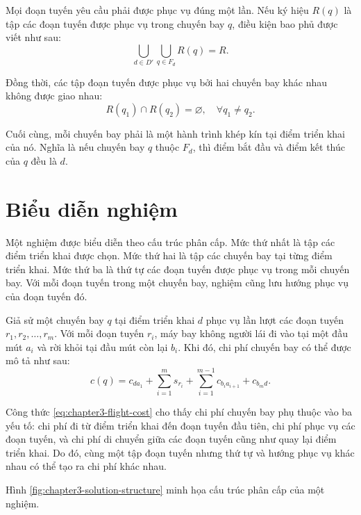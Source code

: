 Mọi đoạn tuyến yêu cầu phải được phục vụ đúng một lần. Nếu ký hiệu $R(q)$ là tập các đoạn tuyến được phục vụ trong chuyến bay $q$, điều kiện bao phủ được viết như sau:
\begin{equation}
    \bigcup_{d \in D'} \bigcup_{q \in F_d} R(q) = R.
    \label{eq:chapter3-coverage}
\end{equation}

Đồng thời, các tập đoạn tuyến được phục vụ bởi hai chuyến bay khác nhau không được giao nhau:
\begin{equation}
    R(q_1) \cap R(q_2) = \varnothing, \quad \forall q_1 \neq q_2.
    \label{eq:chapter3-unique-service}
\end{equation}

Cuối cùng, mỗi chuyến bay phải là một hành trình khép kín tại điểm triển khai của nó. Nghĩa là nếu chuyến bay $q$ thuộc $F_d$, thì điểm bắt đầu và điểm kết thúc của $q$ đều là $d$.

\section{Biểu diễn nghiệm}

Một nghiệm được biểu diễn theo cấu trúc phân cấp. Mức thứ nhất là tập các điểm triển khai được chọn. Mức thứ hai là tập các chuyến bay tại từng điểm triển khai. Mức thứ ba là thứ tự các đoạn tuyến được phục vụ trong mỗi chuyến bay. Với mỗi đoạn tuyến trong một chuyến bay, nghiệm cũng lưu hướng phục vụ của đoạn tuyến đó.

Giả sử một chuyến bay $q$ tại điểm triển khai $d$ phục vụ lần lượt các đoạn tuyến $r_1,r_2,\ldots,r_m$. Với mỗi đoạn tuyến $r_i$, máy bay không người lái đi vào tại một đầu mút $a_i$ và rời khỏi tại đầu mút còn lại $b_i$. Khi đó, chi phí chuyến bay có thể được mô tả như sau:
\begin{equation}
    c(q) = c_{d a_1} + \sum_{i=1}^{m} s_{r_i} + \sum_{i=1}^{m-1} c_{b_i a_{i+1}} + c_{b_m d}.
    \label{eq:chapter3-flight-cost}
\end{equation}

Công thức \eqref{eq:chapter3-flight-cost} cho thấy chi phí chuyến bay phụ thuộc vào ba yếu tố: chi phí đi từ điểm triển khai đến đoạn tuyến đầu tiên, chi phí phục vụ các đoạn tuyến, và chi phí di chuyển giữa các đoạn tuyến cũng như quay lại điểm triển khai. Do đó, cùng một tập đoạn tuyến nhưng thứ tự và hướng phục vụ khác nhau có thể tạo ra chi phí khác nhau.

Hình \ref{fig:chapter3-solution-structure} minh họa cấu trúc phân cấp của một nghiệm.

